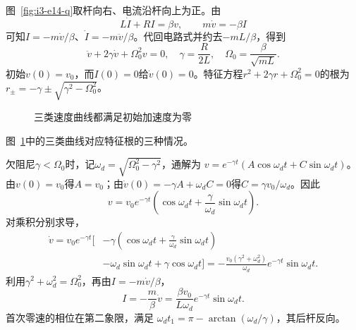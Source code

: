 \begin{solution}
图~\ref{fig:i3-e14-q}取杆向右、电流沿杆向上为正。由
\[
L\dot I+RI=\beta v,\qquad m\dot v=-\beta I
\]
可知$I=-m\dot v/\beta$、$\dot I=-m\ddot v/\beta$。代回电路式并约去$-mL/\beta$，得到
\[
\ddot v+2\gamma\dot v+\Omega_0^2v=0,\quad
\gamma=\frac R{2L},\quad \Omega_0=\frac{\beta}{\sqrt{mL}}.
\]
初始$v(0)=v_0$，而$I(0)=0$给$\dot v(0)=0$。特征方程$r^2+2\gamma r+\Omega_0^2=0$的根为
$r_\pm=-\gamma\pm\sqrt{\gamma^2-\Omega_0^2}$。
\begin{figure}[H]\centering
{}
\caption{三类速度曲线都满足初始加速度为零}\label{fig:i3-e14-s}
\end{figure}
图~\ref{fig:i3-e14-s}中的三类曲线对应特征根的三种情况。

欠阻尼$\gamma<\Omega_0$时，记$\omega_d=\sqrt{\Omega_0^2-\gamma^2}$，通解为
$v=e^{-\gamma t}(A\cos\omega_dt+C\sin\omega_dt)$。
由$v(0)=v_0$得$A=v_0$；由$\dot v(0)=-\gamma A+\omega_dC=0$得$C=\gamma v_0/\omega_d$。因此
\[
\boxed{v=v_0e^{-\gamma t}
\left(\cos\omega_dt+\frac{\gamma}{\omega_d}\sin\omega_dt\right)}.
\]
对乘积分别求导，
\[\begin{aligned}
\dot v=v_0e^{-\gamma t}\bigg[
&-\gamma\left(\cos\omega_dt+\frac\gamma{\omega_d}\sin\omega_dt\right)\\
&-\omega_d\sin\omega_dt+\gamma\cos\omega_dt\bigg]
=-\frac{v_0(\gamma^2+\omega_d^2)}{\omega_d}e^{-\gamma t}\sin\omega_dt.
\end{aligned}\]
利用$\gamma^2+\omega_d^2=\Omega_0^2$，再由$I=-m\dot v/\beta$，
\[
I=-\frac m\beta\dot v
=\frac{\beta v_0}{L\omega_d}e^{-\gamma t}\sin\omega_dt.
\]
首次零速的相位在第二象限，满足
$\omega_dt_1=\pi-\arctan(\omega_d/\gamma)$，其后杆反向。


\end{solution}
